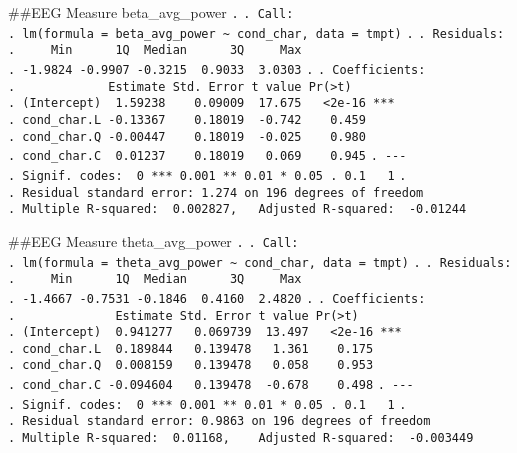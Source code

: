 \documentclass[
]{article}
\begin{document}
\#\#EEG Measure beta\_avg\_power \texttt{.} \texttt{.\ Call:}
\texttt{.\ lm(formula\ =\ beta\_avg\_power\ \textasciitilde{}\ cond\_char,\ data\ =\ tmpt)}
\texttt{.} \texttt{.\ Residuals:}
\texttt{.\ \ \ \ \ Min\ \ \ \ \ \ 1Q\ \ Median\ \ \ \ \ \ 3Q\ \ \ \ \ Max}
\texttt{.\ -1.9824\ -0.9907\ -0.3215\ \ 0.9033\ \ 3.0303} \texttt{.}
\texttt{.\ Coefficients:}
\texttt{.\ \ \ \ \ \ \ \ \ \ \ \ \ Estimate\ Std.\ Error\ t\ value\ Pr(\textgreater{}\textbar{}t\textbar{})}
\texttt{.\ (Intercept)\ \ 1.59238\ \ \ \ 0.09009\ \ 17.675\ \ \ \textless{}2e-16\ ***}
\texttt{.\ cond\_char.L\ -0.13367\ \ \ \ 0.18019\ \ -0.742\ \ \ \ 0.459}
\texttt{.\ cond\_char.Q\ -0.00447\ \ \ \ 0.18019\ \ -0.025\ \ \ \ 0.980}
\texttt{.\ cond\_char.C\ \ 0.01237\ \ \ \ 0.18019\ \ \ 0.069\ \ \ \ 0.945}
\texttt{.\ -\/-\/-}
\texttt{.\ Signif.\ codes:\ \ 0\ \textquotesingle{}***\textquotesingle{}\ 0.001\ \textquotesingle{}**\textquotesingle{}\ 0.01\ \textquotesingle{}*\textquotesingle{}\ 0.05\ \textquotesingle{}.\textquotesingle{}\ 0.1\ \textquotesingle{}\ \textquotesingle{}\ 1}
\texttt{.}
\texttt{.\ Residual\ standard\ error:\ 1.274\ on\ 196\ degrees\ of\ freedom}
\texttt{.\ Multiple\ R-squared:\ \ 0.002827,\ \ \ Adjusted\ R-squared:\ \ -0.01244}

\#\#EEG Measure theta\_avg\_power \texttt{.} \texttt{.\ Call:}
\texttt{.\ lm(formula\ =\ theta\_avg\_power\ \textasciitilde{}\ cond\_char,\ data\ =\ tmpt)}
\texttt{.} \texttt{.\ Residuals:}
\texttt{.\ \ \ \ \ Min\ \ \ \ \ \ 1Q\ \ Median\ \ \ \ \ \ 3Q\ \ \ \ \ Max}
\texttt{.\ -1.4667\ -0.7531\ -0.1846\ \ 0.4160\ \ 2.4820} \texttt{.}
\texttt{.\ Coefficients:}
\texttt{.\ \ \ \ \ \ \ \ \ \ \ \ \ \ Estimate\ Std.\ Error\ t\ value\ Pr(\textgreater{}\textbar{}t\textbar{})}
\texttt{.\ (Intercept)\ \ 0.941277\ \ \ 0.069739\ \ 13.497\ \ \ \textless{}2e-16\ ***}
\texttt{.\ cond\_char.L\ \ 0.189844\ \ \ 0.139478\ \ \ 1.361\ \ \ \ 0.175}
\texttt{.\ cond\_char.Q\ \ 0.008159\ \ \ 0.139478\ \ \ 0.058\ \ \ \ 0.953}
\texttt{.\ cond\_char.C\ -0.094604\ \ \ 0.139478\ \ -0.678\ \ \ \ 0.498}
\texttt{.\ -\/-\/-}
\texttt{.\ Signif.\ codes:\ \ 0\ \textquotesingle{}***\textquotesingle{}\ 0.001\ \textquotesingle{}**\textquotesingle{}\ 0.01\ \textquotesingle{}*\textquotesingle{}\ 0.05\ \textquotesingle{}.\textquotesingle{}\ 0.1\ \textquotesingle{}\ \textquotesingle{}\ 1}
\texttt{.}
\texttt{.\ Residual\ standard\ error:\ 0.9863\ on\ 196\ degrees\ of\ freedom}
\texttt{.\ Multiple\ R-squared:\ \ 0.01168,\ \ \ \ Adjusted\ R-squared:\ \ -0.003449}
\end{document}
